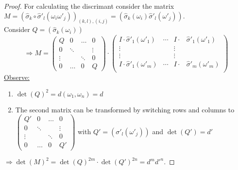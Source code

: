 \begin{proof}
For calculating the discrimant consider the matrix $M= ( \hat{\sigma}_k \circ \hat{\sigma}'_l (\omega_i \omega'_j))_{(k,l),(i,j)} = (\hat{\sigma}_k(\omega_i) \hat{\sigma}'_l(\omega'_j))$.\\
Consider $Q= (\hat{\sigma}_k(\omega_i))$
\[
\Rightarrow M= \begin{pmatrix}
Q &0 &\dots &0\\
0 &\ddots & &\vdots\\
\vdots &&\ddots &0\\
0 &\hdots &0 &Q
\end{pmatrix}
\cdot
\begin{pmatrix}
I\cdot \hat{\sigma}'_1(\omega'_1) &\cdots &I\cdot &\hat{\sigma}'_1(\omega'_1)\\
\vdots & &\vdots\\
\vdots &  &\vdots\\
I\cdot \hat{\sigma}'_1(\omega'_m) &\cdots &I\cdot &\hat{\sigma}'_m(\omega'_m)\\
\end{pmatrix}
\]
\underline{Observe:}
\begin{enumerate}[(1)]
\item $\det(Q)^2=d(\omega_1, \omega_n)=d$
\item The second matrix can be transformed by switching rows and columns to $\begin{pmatrix}
Q' &0 &\dots &0\\
0 &\ddots & &\vdots\\
\vdots &&\ddots &0\\
0 &\hdots &0 &Q'
\end{pmatrix}$ with $Q'=(\sigma'_l(\omega'_j))$ and $\det(Q')=d'$
\end{enumerate}
$\Rightarrow \det(M)^2=\det(Q)^{2m} \cdot \det(Q')^{2n} = d^m d'^n$.
\end{proof}

